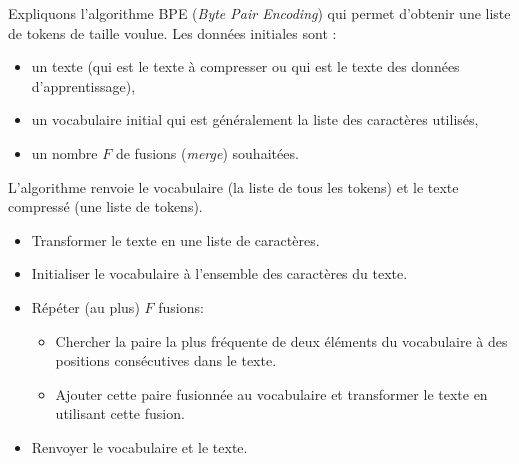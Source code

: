 \documentclass[11pt,class=report,crop=false]{standalone}
\begin{document}
\medskip

Expliquons l'algorithme BPE (\emph{Byte Pair Encoding}) qui permet d'obtenir une liste de tokens de taille voulue.
Les données initiales sont :
\begin{itemize}
	\item un texte (qui est le texte à compresser ou qui est le texte des données d'apprentissage),
	\item un vocabulaire initial qui est généralement la liste des caractères utilisés,
	\item un nombre $F$ de fusions (\emph{merge}) souhaitées.
\end{itemize}
L'algorithme renvoie le vocabulaire (la liste de tous les tokens) et le texte compressé (une liste de tokens).


\begin{algorithme}
\sauteligne
\begin{itemize}
	\item Transformer le texte en une liste de caractères.	
	\item Initialiser le vocabulaire à l'ensemble des caractères du texte.
	\item Répéter (au plus) $F$ fusions:
	\begin{itemize}
		\item Chercher la paire la plus fréquente de deux éléments du vocabulaire à des positions consécutives dans le texte.
		\item Ajouter cette paire fusionnée au vocabulaire et transformer le texte en utilisant cette fusion.
	\end{itemize}
	\item Renvoyer le vocabulaire et le texte.		
\end{itemize}
\end{algorithme}
\end{document}
